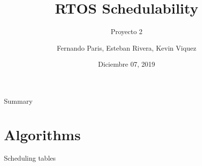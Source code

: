 \documentclass[aspectratio=43, xcolor=table]{beamer}
\title{RTOS Schedulability}
\subtitle{Proyecto 2}
\author[F. Paris, E. Rivera, K. Viquez]{Fernando Paris, Esteban Rivera, Kevin Viquez}
\institute[ITCR]{
    Maestria en Sistemas Empotrados%
    \\%
    Instituto Tenologico de Costa Rica%
}\date{Diciembre 07, 2019}
\begin{document}
\frame{\titlepage}

\begin{frame}{Summary}
\tableofcontents
\end{frame}

\section{Algorithms}

\frame{\sectionpage}

\begin{frame}{Scheduling tables}
\setlength{\arrayrulewidth}{0.1mm}
\setlength{\tabcolsep}{1pt}
\renewcommand{\arraystretch}{0.5}
\begin{table}[]
\centering
\begin{tabular}{|p{3mm}|p{1mm}|p{1mm}|p{1mm}|p{1mm}|p{1mm}|p{1mm}|p{1mm}|p{1mm}|p{1mm}|p{1mm}|p{1mm}|p{1mm}|p{1mm}|p{1mm}|p{1mm}|p{1mm}|p{1mm}|p{1mm}|p{1mm}|p{1mm}|p{1mm}|p{1mm}|p{1mm}|p{1mm}|p{1mm}|p{1mm}|p{1mm}|p{1mm}|p{1mm}|p{1mm}|p{1mm}|p{1mm}|p{1mm}|p{1mm}|p{1mm}|p{1mm}|p{1mm}|p{1mm}|p{1mm}|p{1mm}|p{1mm}|p{1mm}|p{1mm}|p{1mm}|p{1mm}|p{1mm}|p{1mm}|p{1mm}|p{1mm}|p{1mm}|p{1mm}|p{1mm}|p{1mm}|p{1mm}|p{1mm}|p{1mm}|p{1mm}|p{1mm}|p{1mm}|p{1mm}|p{1mm}|p{1mm}|p{1mm}|p{1mm}|p{1mm}|}
\hline

\end{tabular}
\end{table}
\end{frame}
\end{document}
